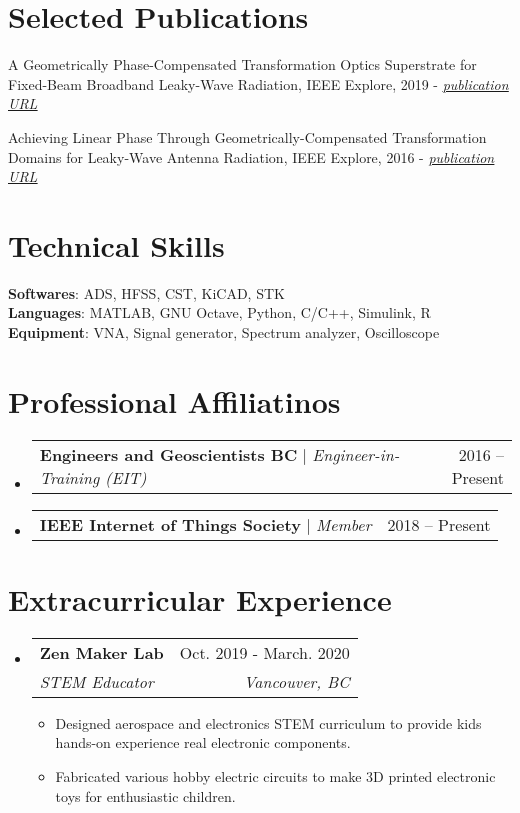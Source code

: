 \documentclass[letterpaper,11pt]{article}
\makeatletter
\newcommand{\resumeItem}[1]{
  \item\small{
    {#1 \vspace{-2pt}}
  }
}
\newcommand{\resumeSubheading}[4]{
  \vspace{-2pt}\item
    \begin{tabular*}{0.97\textwidth}[t]{l@{\extracolsep{\fill}}r}
      \textbf{#1} & #2 \\
      \textit{\small#3} & \textit{\small #4} \\
    \end{tabular*}\vspace{-7pt}
}
\newcommand{\resumeProjectHeading}[2]{
    \item
    \begin{tabular*}{0.97\textwidth}{l@{\extracolsep{\fill}}r}
      \small#1 & #2 \\
    \end{tabular*}\vspace{-7pt}
}
\newcommand{\resumeSubHeadingListStart}{\begin{itemize}[leftmargin=0.15in, label={}]}
\newcommand{\resumeSubHeadingListEnd}{\end{itemize}}
\newcommand{\resumeItemListStart}{\begin{itemize}}
\newcommand{\resumeItemListEnd}{\end{itemize}\vspace{-5pt}}
\makeatother
\begin{document}
%
\section{Selected Publications}
 \begin{itemize}[leftmargin=0.15in, label={\tiny$\bullet$}]
    \small{
    \item{A Geometrically Phase-Compensated Transformation Optics Superstrate for Fixed-Beam Broadband Leaky-Wave Radiation, IEEE Explore, 2019 - \href{https://ieeexplore.ieee.org/document/8739640}{\textit{\underline{publication URL}}}}
    \item{ Achieving Linear Phase Through Geometrically-Compensated Transformation Domains for Leaky-Wave Antenna Radiation, IEEE Explore, 2016 - \href{https://ieeexplore.ieee.org/document/7695749}{\textit{\underline{publication URL}}}}
    }
 \end{itemize}


\section{Technical Skills}
 \begin{itemize}[leftmargin=0.15in, label={}]
    \small{\item{
     \textbf{Softwares}{: ADS, HFSS, CST, KiCAD, STK} \\
     \textbf{Languages}{: MATLAB, GNU Octave, Python, C/C++, Simulink, R} \\
     \textbf{Equipment}{: VNA, Signal generator, Spectrum analyzer, Oscilloscope}
    }}
 \end{itemize}

%
\section{Professional Affiliatinos}
    \resumeSubHeadingListStart
      \resumeProjectHeading
          {\textbf{Engineers and Geoscientists BC} $|$ \emph{Engineer-in-Training (EIT) }}{2016 -- Present}

      \resumeProjectHeading
          {\textbf{IEEE Internet of Things Society} $|$ \emph{Member}}{2018 -- Present}

    \resumeSubHeadingListEnd
    
\section{Extracurricular Experience}
  \resumeSubHeadingListStart

    \resumeSubheading
      {Zen Maker Lab}{Oct. 2019 - March. 2020}
      {STEM Educator}{Vancouver, BC}
      \resumeItemListStart
        \resumeItem{Designed aerospace and electronics STEM curriculum to provide kids hands-on experience real electronic components.}
        \resumeItem{Fabricated various hobby electric circuits to make 3D printed electronic toys for enthusiastic children.}
      \resumeItemListEnd

    \resumeSubHeadingListEnd
    
\end{document}
